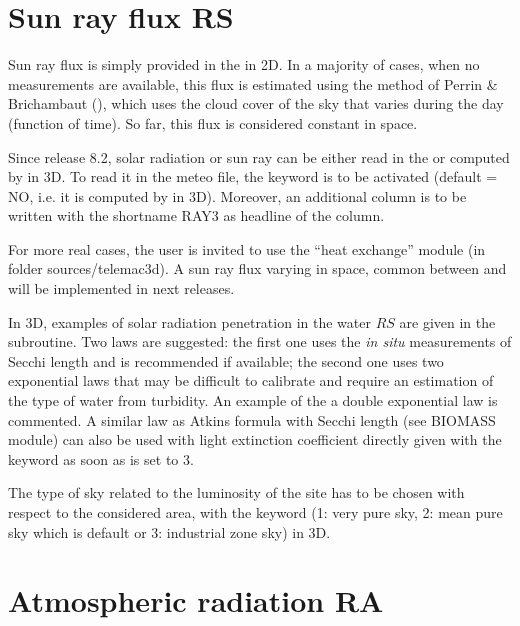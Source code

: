 \section{Sun ray flux RS}

Sun ray flux is simply provided in the  in 2D.
In a majority of cases, when no measurements are available,
this flux is estimated using the method of Perrin \& Brichambaut (\cite{El-Kadi2012}),
which uses the cloud cover of the sky that varies during the day (function of time).
So far, this flux is considered constant in space.

Since release 8.2, solar radiation or sun ray can be either read in the 
 or computed by \waqtel in 3D.
To read it in the meteo file, the keyword
 is to be activated (default = NO,
i.e. it is computed by \waqtel in 3D).
Moreover, an additional column is to be written with the shortname RAY3
as headline of the column.

For more real cases, the user is invited to use the ``heat exchange'' module
(in folder sources/telemac3d).
A sun ray flux varying in space, common between  and  will be implemented in next releases.

In 3D, examples of solar radiation penetration in the water $RS$ are given in the
 subroutine. Two laws are suggested: the first one
uses the \emph{in situ} measurements of Secchi length and is
recommended if available; the second one uses two exponential laws that may be
difficult to calibrate and require an estimation of the type of water from
turbidity.
An example of the a double exponential law is commented.
A similar law as Atkins formula with Secchi length (see BIOMASS module) can also be
used with light extinction coefficient directly given with the keyword
 as soon as
 is set to 3.

The type of sky related to the luminosity of the site has to be chosen
with respect to the considered area, with the \waqtel keyword
 (1: very pure sky, 2: mean pure sky which is default
or 3: industrial zone sky) in 3D.


\section{Atmospheric radiation RA}

